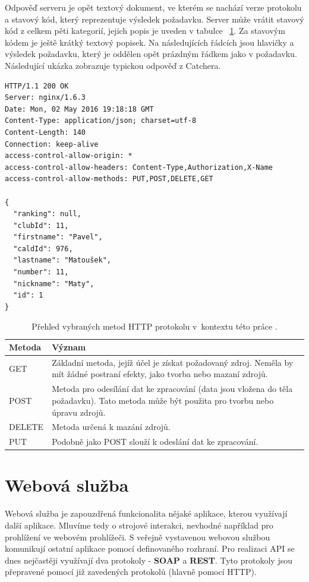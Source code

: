 \medskip


Odpověď serveru je opět textový dokument, ve kterém se nachází verze protokolu a stavový kód,
který reprezentuje výsledek požadavku. Server může vrátit stavový kód z celkem pěti kategorií,
jejich popis je uveden v tabulce ~\ref{tab:http_metody}. Za stavovým kódem je ještě krátký textový popisek. Na následujících
řádcích jsou hlavičky a výsledek požadavku, který je oddělen opět prázdným řádkem jako v požadavku.
Následující ukázka zobrazuje typickou odpověď z Catchera. 

\begingroup
\fontsize{9.5pt}{11pt}\selectfont
\begin{verbatim}
HTTP/1.1 200 OK
Server: nginx/1.6.3
Date: Mon, 02 May 2016 19:18:18 GMT
Content-Type: application/json; charset=utf-8
Content-Length: 140
Connection: keep-alive
access-control-allow-origin: *
access-control-allow-headers: Content-Type,Authorization,X-Name
access-control-allow-methods: PUT,POST,DELETE,GET

{
  "ranking": null,
  "clubId": 11,
  "firstname": "Pavel",
  "caldId": 976,
  "lastname": "Matoušek",
  "number": 11,
  "nickname": "Maty",
  "id": 1
}
\end{verbatim}
\endgroup

\begin{table}[]
\centering
\begin{tabular}{lp{9.5cm}}
\textbf{Metoda} & \textbf{Význam}\\ \midrule
GET & Základní metoda, jejíž účel je získat požadovaný zdroj. Neměla by mít žádné postraní efekty, jako tvorba nebo mazaní zdrojů.\\ \midrule
POST & Metoda pro odesílání dat ke zpracování (data jsou vložena do těla požadavku). Tato metoda může být použita pro tvorbu nebo úpravu zdrojů.\\
\midrule
DELETE & Metoda určená k mazání zdrojů.\\
\midrule
PUT & Podobně jako POST slouží k odeslání dat ke zpracování.\\
\midrule
\end{tabular}
\caption{Přehled vybraných metod HTTP protokolu v~kontextu této práce \cite{http_metody}.}
\label{tab:http_metody}
\end{table}


\section{Webová služba}

\indent

Webová služba je zapouzdřená funkcionalita nějaké aplikace, kterou využívají další aplikace.
Mluvíme tedy o strojové interakci, nevhodné například pro prohlížení ve webovém prohlížeči.
S veřejně vystavenou webovou službou komunikují ostatní aplikace pomocí definovaného rozhraní.
Pro realizaci API se dnes nejčastěji využívají dva protokoly - \textbf{SOAP} a \textbf{REST}.
Tyto protokoly jsou přepravené pomocí již zavedených protokolů (hlavně pomocí HTTP).